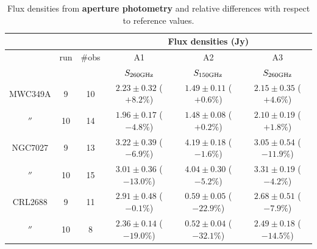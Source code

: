 \begin{table}[th]
\begin{center}
\begin{tabular}{|c|c|c|c|c|c|}
\hline
\multicolumn{3}{|c}{}  & \multicolumn{3}{|c|}{Flux densities (Jy)}   \\
\hline
         & run  & \#obs &  A1                    &  A2                   &    A3                    \\
         &      &      &  $S_{260 {\rm GHz}}$     &  $S_{150 {\rm GHz}}$  & $S_{260 {\rm GHz}}$    \\
\hline\hline
MWC349A   &  9   & 10  &  $2.23\pm0.32$  ($+8.2\%$)  &  $1.49\pm0.11$ ($+0.6\%$) &  $2.15\pm0.35$ ($+4.6\%$)      \\
  $''$   & 10   & 14  &  $1.96\pm0.17$  ($-4.8\%$)  &  $1.48\pm0.08$ ($+0.2\%$) &  $2.10\pm0.19$ ($+1.8\%$)                  \\ 
  \hline
NGC7027  &  9   & 13  &  $3.22\pm0.39$  ($-6.9\%$)  &  $4.19\pm0.18$ ($-1.6\%$) & $3.05\pm0.54$  ($-11.9\%$)      \\
  $''$   & 10   & 15  &  $3.01\pm0.36$  ($-13.0\%$) &  $4.04\pm0.30$ ($-5.2\%$) & $3.31\pm0.19$  ($-4.2\%$)                   \\ 
  \hline
CRL2688  &  9   & 11  &  $2.91\pm0.48$  ($-0.1\%$)  &  $0.59\pm0.05$ ($-22.9\%$)  &  $2.68\pm0.51$ ($-7.9\%$)     \\
  $''$   & 10   &  8  &  $2.36\pm0.14$  ($-19.0\%$) &  $0.52\pm0.04$ ($-32.1\%$)  &  $2.49\pm0.18$ ($-14.5\%$)                   \\
\hline
\end{tabular}
\caption{Flux densities from {\bf aperture photometry} and relative differences   with respect to reference values.}
\label{tab:flux_sec_Ap}
\end{center}
\end{table}

